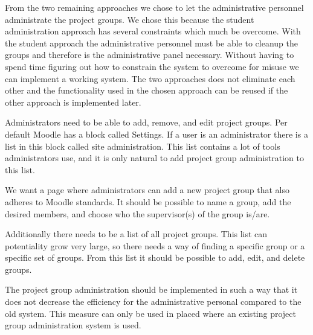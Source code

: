 From the two remaining approaches we chose to let the administrative personnel administrate the project groups. 
We chose this because the student administration approach has several constraints which much be overcome. 
With the student approach the administrative personnel must be able to cleanup the groups and therefore is the administrative panel necessary. 
Without having to spend time figuring out how to constrain the system to overcome for misuse we can implement a working system. 
The two approaches does not eliminate each other and the functionality used in the chosen approach can be reused if the other approach is implemented later.

Administrators need to be able to add, remove, and edit project groups.
Per default Moodle has a block called Settings. 
If a user is an administrator there is a list in this block called site administration. 
This list contains a lot of tools administrators use, and it is only natural to add project group administration to this list. 

We want a page where administrators can add a new project group that also adheres to Moodle standards.
It should be possible to name a group, add the desired members, and choose who the supervisor(s) of the group is/are.

Additionally there needs to be a list of all project groups.
This list can potentiality grow very large, so there needs a way of finding a specific group or a specific set of groups. 
From this list it should be possible to add, edit, and delete groups. 

The project group administration should be implemented in such a way that it does not decrease the efficiency for the administrative personal compared to the old system. 
This measure can only be used in placed where an existing project group administration system is used.
